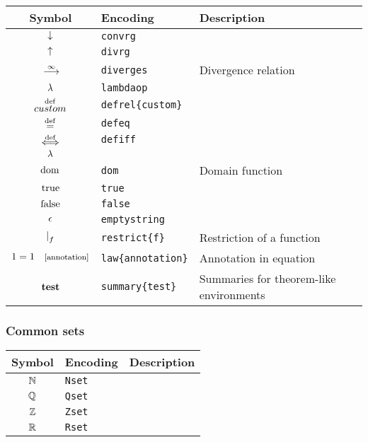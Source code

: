 \documentclass[11pt]{article}
\begin{document}
\begin{table}[H]
	\def\arraystretch{1.5}
	\begin{tabular}{c l l}
		\textbf{Symbol} & \textbf{Encoding} & \textbf{Description} \\
		\hline 
		$\mathord{\downarrow}$ & \texttt{convrg} &  \\ 
		$\mathord{\uparrow}$ & \texttt{divrg} &  \\
		$\diverges$ & \texttt{diverges} & Divergence relation \\
		$\mathop{\lambda}\nolimits$ & \texttt{lambdaop} &  \\
		$\defrel{custom}$ & \texttt{defrel\{custom\}} &  \\
		$\defeq$ & \texttt{defeq} &  \\
		$\defiff$ & \texttt{defiff} &  \\
		$\mathop{\lambda}\nolimits$ &  &  \\
		$\mathop{\mathrm{dom}}\nolimits$ & \texttt{dom} & Domain function \\
		$\mathrm{true}$ & \texttt{true} &  \\
		$\mathrm{false}$ & \texttt{false} &  \\
		$\mathord{\epsilon}$ & \texttt{emptystring} & \\
		$\mathop{\mid}\nolimits_{f}$ & \texttt{restrict\{f\}} & Restriction of a function \\
		$1 = 1 \quad \law{annotation}$ & \texttt{law\{annotation\}} & Annotation in equation \\
		$\textrm{\textbf{\textup{test}}}$ & \texttt{summary\{test\}} & Summaries for theorem-like environments \\
		
	\end{tabular} 
\end{table}

\subsubsection{Common sets}

\begin{table}[H]
	\def\arraystretch{1.5}
	\begin{tabular}{c l l}
		\textbf{Symbol} & \textbf{Encoding} & \textbf{Description} \\
		\hline 
		$\mathbb{N}$ & \texttt{Nset} &  \\ 
		$\mathbb{Q}$ & \texttt{Qset} &  \\
		$\mathbb{Z}$ & \texttt{Zset} &  \\
		$\mathbb{R}$ & \texttt{Rset} &  \\
	\end{tabular} 
\end{table}
\end{document}
